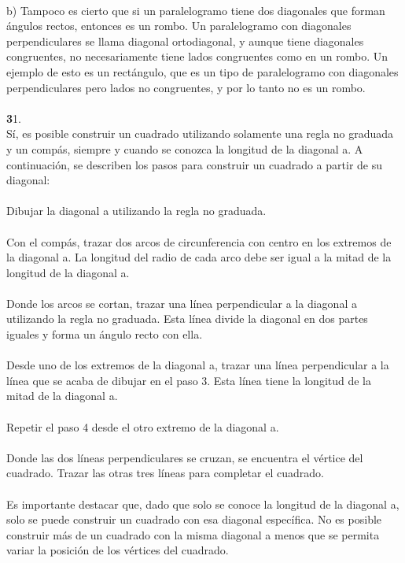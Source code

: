 \documentclass{article}
\begin{document}
\\
b) Tampoco es cierto que si un paralelogramo tiene dos diagonales que forman ángulos rectos, entonces es un rombo. Un paralelogramo con diagonales perpendiculares se llama diagonal ortodiagonal, y aunque tiene diagonales congruentes, no necesariamente tiene lados congruentes como en un rombo. Un ejemplo de esto es un rectángulo, que es un tipo de paralelogramo con diagonales perpendiculares pero lados no congruentes, y por lo tanto no es un rombo.\\
\\
{\textbf 31. }\\
Sí, es posible construir un cuadrado utilizando solamente una regla no graduada y un compás, siempre y cuando se conozca la longitud de la diagonal a. A continuación, se describen los pasos para construir un cuadrado a partir de su diagonal:\\
\\
Dibujar la diagonal a utilizando la regla no graduada.\\
\\
Con el compás, trazar dos arcos de circunferencia con centro en los extremos de la diagonal a. La longitud del radio de cada arco debe ser igual a la mitad de la longitud de la diagonal a.\\
\\
Donde los arcos se cortan, trazar una línea perpendicular a la diagonal a utilizando la regla no graduada. Esta línea divide la diagonal en dos partes iguales y forma un ángulo recto con ella.\\
\\
Desde uno de los extremos de la diagonal a, trazar una línea perpendicular a la línea que se acaba de dibujar en el paso 3. Esta línea tiene la longitud de la mitad de la diagonal a.\\
\\
Repetir el paso 4 desde el otro extremo de la diagonal a.\\
\\
Donde las dos líneas perpendiculares se cruzan, se encuentra el vértice del cuadrado. Trazar las otras tres líneas para completar el cuadrado.\\
\\
Es importante destacar que, dado que solo se conoce la longitud de la diagonal a, solo se puede construir un cuadrado con esa diagonal específica. No es posible construir más de un cuadrado con la misma diagonal a menos que se permita variar la posición de los vértices del cuadrado.\\
\end{document}
